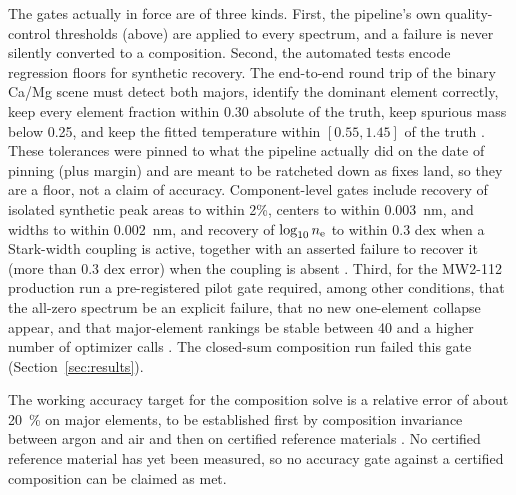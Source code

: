 The gates actually in force are of three kinds. First, the pipeline's own quality-control thresholds (above) are applied to every spectrum, and a failure is never silently converted to a composition. Second, the automated tests encode regression floors for synthetic recovery. The end-to-end round trip of the binary Ca/Mg scene must detect both majors, identify the dominant element correctly, keep every element fraction within 0.30 absolute of the truth, keep spurious mass below 0.25, and keep the fitted temperature within $[0.55,1.45]$ of the truth %
. These tolerances were pinned to what the pipeline actually did on the date of pinning (plus margin) and are meant to be ratcheted down as fixes land, so they are a floor, not a claim of accuracy. Component-level gates include recovery of isolated synthetic peak areas to within 2\%, centers to within \SI{0.003}{\nano\metre}, and widths to within \SI{0.002}{\nano\metre}, and recovery of $\log_{10}n_{\mathrm{e}}$ to within 0.3 dex when a Stark-width coupling is active, together with an asserted failure to recover it (more than 0.3 dex error) when the coupling is absent %
. Third, for the MW2-112 production run a pre-registered pilot gate required, among other conditions, that the all-zero spectrum be an explicit failure, that no new one-element collapse appear, and that major-element rankings be stable between 40 and a higher number of optimizer calls %
. The closed-sum composition run failed this gate (Section~\ref{sec:results}).

The working accuracy target for the composition solve is a relative error of about \SI{20}{\percent} on major elements, to be established first by composition invariance between argon and air and then on certified reference materials %
. No certified reference material has yet been measured, so no accuracy gate against a certified composition can be claimed as met.
